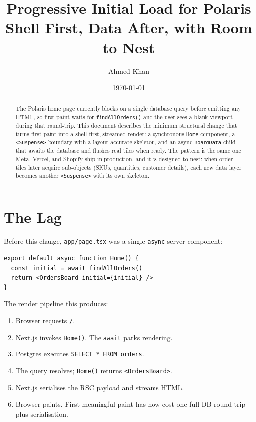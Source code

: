 \documentclass[11pt]{article}
\title{\textbf{Progressive Initial Load for Polaris}\\\large Shell First, Data After, with Room to Nest}
\author{Ahmed Khan}
\date{\today}
\begin{document}
\maketitle

\begin{abstract}
\noindent The Polaris home page currently blocks on a single database query before emitting any HTML, so first paint waits for \texttt{findAllOrders()} and the user sees a blank viewport during that round-trip. This document describes the minimum structural change that turns first paint into a shell-first, streamed render: a synchronous \texttt{Home} component, a \texttt{<Suspense>} boundary with a layout-accurate skeleton, and an async \texttt{BoardData} child that awaits the database and flushes real tiles when ready. The pattern is the same one Meta, Vercel, and Shopify ship in production, and it is designed to nest: when order tiles later acquire sub-objects (SKUs, quantities, customer details), each new data layer becomes another \texttt{<Suspense>} with its own skeleton.
\end{abstract}

\section{The Lag}

Before this change, \texttt{app/page.tsx} was a single \texttt{async} server component:

\begin{lstlisting}
export default async function Home() {
  const initial = await findAllOrders()
  return <OrdersBoard initial={initial} />
}
\end{lstlisting}

The render pipeline this produces:

\begin{enumerate}[leftmargin=1.4em, itemsep=0.15em]
  \item Browser requests \texttt{/}.
  \item Next.js invokes \texttt{Home()}. The \texttt{await} parks rendering.
  \item Postgres executes \texttt{SELECT * FROM orders}.
  \item The query resolves; \texttt{Home()} returns \texttt{<OrdersBoard>}.
  \item Next.js serialises the RSC payload and streams HTML.
  \item Browser paints. First meaningful paint has now cost one full DB round-trip plus serialisation.
\end{enumerate}
\end{document}
